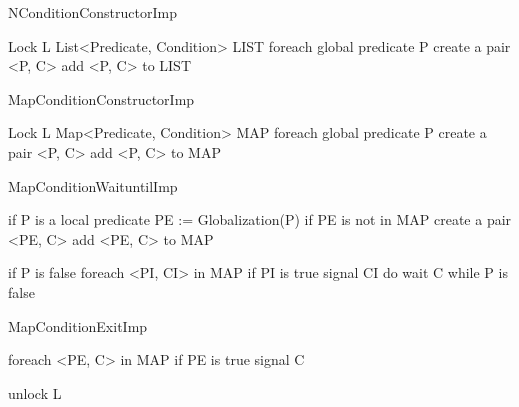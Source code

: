 \documentclass[10pt, conference, compsocconf]{IEEEtran}
\begin{document}
\begin{SaveVerbatim}{NConditionConstructorImp}

Lock L
List<Predicate, Condition> LIST
foreach global predicate P
  create a pair <P, C>
  add <P, C> to LIST
\end{SaveVerbatim}

% 
%
%
%


\begin{SaveVerbatim}{MapConditionConstructorImp}

Lock L
Map<Predicate, Condition> MAP
foreach global predicate P
  create a pair <P, C>
  add <P, C> to MAP 
\end{SaveVerbatim}

\begin{SaveVerbatim}{MapConditionWaituntilImp}

if P is a local predicate 
  PE := Globalization(P)
  if PE is not in MAP
    create a pair <PE, C>
    add <PE, C> to MAP
 
if P is false 
  foreach <PI, CI> in MAP
    if PI is true
      signal CI
  do 
    wait C
  while P is false
\end{SaveVerbatim}

\begin{SaveVerbatim}{MapConditionExitImp}

foreach <PE, C> in MAP
  if PE is true
    signal C

unlock L
\end{SaveVerbatim}
\end{document}

